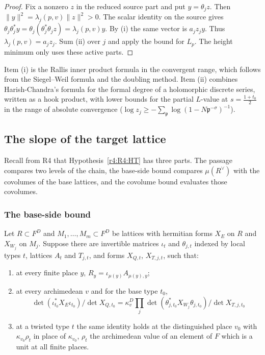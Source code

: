\begin{proof}
Fix a nonzero $z$ in the reduced source part and put $y=\theta_jz$.
Then $\|y\|^2=\lambda_j(p,v)\|z\|^2>0$. The scalar identity on the
source gives $\theta_j\theta_j^* y=\theta_j(\theta_j^*\theta_jz)
=\lambda_j(p,v)y$. By (i) the same vector is $a_jz_j y$.
Thus $\lambda_j(p,v)=a_jz_j$. Sum (ii) over $j$ and apply the
bound for $L_p$. The height minimum only uses these active parts.
\end{proof}



Item (i) is the Rallis inner product formula in the convergent range, which follows from the Siegel--Weil formula and the doubling method. Item (ii) combines Harish-Chandra's formula for the formal degree of a holomorphic discrete series, written as a hook product, with lower bounds for the partial $L$-value at $s=\frac{1+t_0}2$ in the range of absolute convergence ($\log z_j\ge-\sum_{\mathfrak p}\log(1-N\mathfrak p^{-\sigma})^{-1}$). 

\subsection{The slope of the target lattice}\label{w3:sec:HT}

Recall from R4 that Hypothesis~\ref{r4:R4:HT} has three parts. The passage compares two levels of the chain, the base-side bound compares $\mu(R^\vee)$ with the covolumes of the base lattices, and the covolume bound evaluates those covolumes.

\subsubsection{The base-side bound}

Let $R\subset F^D$ and $M_1,\dots,M_m\subset F^D$ be lattices with hermitian forms $X_E$ on $R$ and $X_{W_j}$ on $M_j$. Suppose there are invertible matrices $\iota_t$ and $\theta_{j,t}$ indexed by local types $t$, lattices $A_t$ and $T_{j,t}$, and forms $X_{Q,t}$, $X_{T,j,t}$, such that:
\begin{enumerate}
\item[(a)] at every finite place $y$, $R_y=\iota_{\mu(y)}A_{\mu(y),y}$;
\item[(b)] at every archimedean $v$ and for the base type $t_0$,
\[
\det(\iota_{t_0}^*X_E\iota_{t_0})/\det X_{Q,t_0}=\kappa_v^D\prod_j\det(\theta_{j,t_0}^*X_{W_j}\theta_{j,t_0})/\det X_{T,j,t_0}
\]
\item[(c)] at a twisted type $t$ the same identity holds at the distinguished place $v_0$ with $\kappa_{v_0}\rho_t$ in place of $\kappa_{v_0}$, $\rho_t$ the archimedean value of an element of $F$ which is a unit at all finite places.
\end{enumerate}

